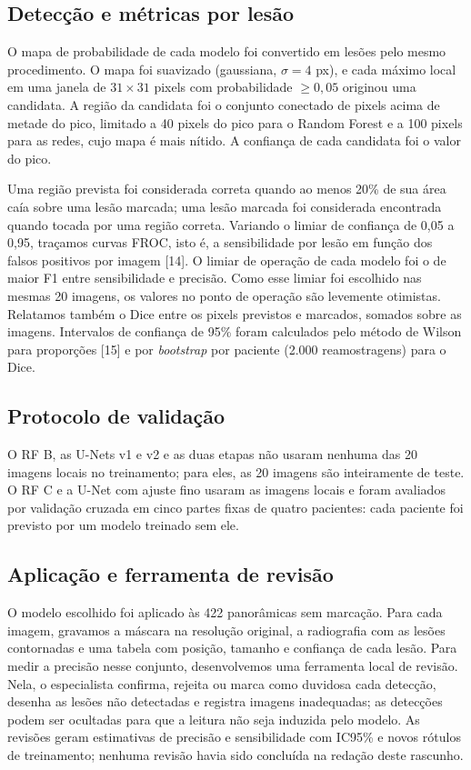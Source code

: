 \documentclass[twocolumn]{article}
\begin{document}
\subsection{Detecção e métricas por lesão}

O mapa de probabilidade de cada modelo foi convertido em lesões pelo mesmo procedimento. O mapa foi suavizado (gaussiana, $\sigma = 4$ px), e cada máximo local em uma janela de $31 \times 31$ pixels com probabilidade $\geq 0{,}05$ originou uma candidata. A região da candidata foi o conjunto conectado de pixels acima de metade do pico, limitado a 40 pixels do pico para o Random Forest e a 100 pixels para as redes, cujo mapa é mais nítido. A confiança de cada candidata foi o valor do pico.

Uma região prevista foi considerada correta quando ao menos 20\% de sua área caía sobre uma lesão marcada; uma lesão marcada foi considerada encontrada quando tocada por uma região correta. Variando o limiar de confiança de 0,05 a 0,95, traçamos curvas FROC, isto é, a sensibilidade por lesão em função dos falsos positivos por imagem [14]. O limiar de operação de cada modelo foi o de maior F1 entre sensibilidade e precisão. Como esse limiar foi escolhido nas mesmas 20 imagens, os valores no ponto de operação são levemente otimistas. Relatamos também o Dice entre os pixels previstos e marcados, somados sobre as imagens. Intervalos de confiança de 95\% foram calculados pelo método de Wilson para proporções [15] e por \textit{bootstrap} por paciente (2.000 reamostragens) para o Dice.

\subsection{Protocolo de validação}

O RF B, as U-Nets v1 e v2 e as duas etapas não usaram nenhuma das 20 imagens locais no treinamento; para eles, as 20 imagens são inteiramente de teste. O RF C e a U-Net com ajuste fino usaram as imagens locais e foram avaliados por validação cruzada em cinco partes fixas de quatro pacientes: cada paciente foi previsto por um modelo treinado sem ele.

\subsection{Aplicação e ferramenta de revisão}

O modelo escolhido foi aplicado às 422 panorâmicas sem marcação. Para cada imagem, gravamos a máscara na resolução original, a radiografia com as lesões contornadas e uma tabela com posição, tamanho e confiança de cada lesão. Para medir a precisão nesse conjunto, desenvolvemos uma ferramenta local de revisão. Nela, o especialista confirma, rejeita ou marca como duvidosa cada detecção, desenha as lesões não detectadas e registra imagens inadequadas; as detecções podem ser ocultadas para que a leitura não seja induzida pelo modelo. As revisões geram estimativas de precisão e sensibilidade com IC95\% e novos rótulos de treinamento; nenhuma revisão havia sido concluída na redação deste rascunho.
\end{document}
